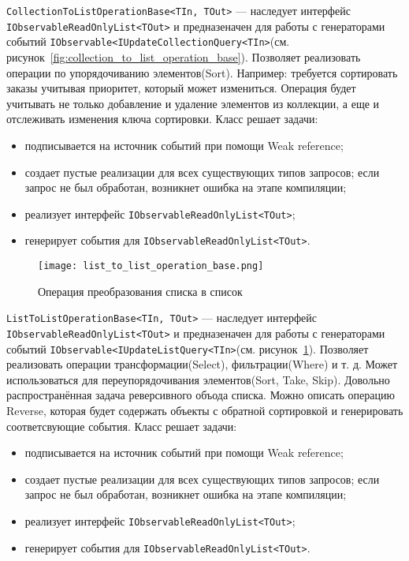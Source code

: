 \lstinline[style=csharpinlinestyle]!CollectionToListOperationBase<TIn, TOut>! --- наследует интерфейс \lstinline[style=csharpinlinestyle]!IObservableReadOnlyList<TOut>!
и предназеначен для работы с генераторами событий \lstinline[style=csharpinlinestyle]!IObservable<IUpdateCollectionQuery<TIn>!(см. рисунок~\ref{fig:collection_to_list_operation_base}).
Позволяет реализовать операции по упорядочиванию элементов(Sort). Например: требуется сортировать заказы учитывая приоритет, который может измениться.
Операция будет учитывать не только добавление и удаление элементов из коллекции, а еще и отслеживать изменения ключа сортировки.
Класс решает задачи:

\begin{itemize}
  \item подписывается на источник событий при помощи Weak reference;
  \item создает пустые реализации для всех существующих типов запросов; если запрос не был обработан, возникнет ошибка на этапе компиляции;
  \item реализует интерфейс \lstinline[style=csharpinlinestyle]!IObservableReadOnlyList<TOut>!;
  \item генерирует события для \lstinline[style=csharpinlinestyle]!IObservableReadOnlyList<TOut>!.
\end{itemize}

\begin{figure}[ht]
\centering
  \texttt{[image: list\_to\_list\_operation\_base.png]}
  \caption{ Операция преобразования списка в список }
  \label{fig:list_to_list_operation_base}
\end{figure}

\lstinline[style=csharpinlinestyle]!ListToListOperationBase<TIn, TOut>! --- наследует интерфейс \lstinline[style=csharpinlinestyle]!IObservableReadOnlyList<TOut>!
и предназеначен для работы с генераторами событий \lstinline[style=csharpinlinestyle]!IObservable<IUpdateListQuery<TIn>!(см. рисунок~\ref{fig:list_to_list_operation_base}).
Позволяет реализовать операции трансформации(Select), фильтрации(Where) и т. д. Может использоваться для переупорядочивания элементов(Sort, Take, Skip).
Довольно распространённая задача реверсивного объода списка. Можно описать операцию Reverse, которая будет содержать объекты с обратной сортировкой и генерировать соответсвующие события.
Класс решает задачи:

\begin{itemize}
  \item подписывается на источник событий при помощи Weak reference;
  \item создает пустые реализации для всех существующих типов запросов; если запрос не был обработан, возникнет ошибка на этапе компиляции;
  \item реализует интерфейс \lstinline[style=csharpinlinestyle]!IObservableReadOnlyList<TOut>!;
  \item генерирует события для \lstinline[style=csharpinlinestyle]!IObservableReadOnlyList<TOut>!.
\end{itemize}

